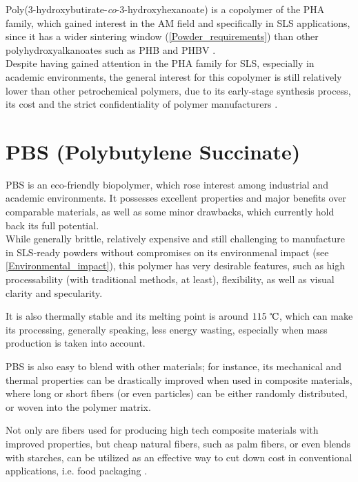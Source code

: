 \documentclass{article}
\begin{document}
    Poly(3-hydroxybutirate-\textit{co}-3-hydroxyhexanoate) is a copolymer of the PHA family, which gained 
    interest in the AM field and specifically in SLS applications, since it has a wider sintering window (\ref{Powder_requirements}) than other polyhydroxyalkanoates
    such as PHB and PHBV \autocites{DechetMaximilianA2020OtDo}{doi:10.1063/1.4918516}. \\ 
    
    Despite having gained attention in the PHA family for SLS, especially in academic environments, the general interest for this copolymer
    is still relatively lower than other 
    petrochemical polymers, due to its early-stage synthesis process, its cost and the strict confidentiality 
    of polymer manufacturers \autocite{Eraslan_PHBH_review}.  \clearpage

    \section{PBS (Polybutylene Succinate) \label{PBS_in_general}}

    PBS is an eco-friendly biopolymer, which rose interest among 
    industrial and academic environments. It possesses excellent properties and major benefits over comparable materials, as well as some minor drawbacks, 
    which currently hold back its full potential. \\ 
    
    While generally brittle, relatively expensive and still challenging to manufacture in SLS-ready powders without compromises on its environmenal 
    impact (see \ref{Environmental_impact}), this polymer has very desirable features, such as high processability 
    (with traditional methods, at least), flexibility, as well as visual clarity and specularity. 

    It is also thermally stable and its melting point is around $115 \ \celsius $, which can make its processing, generally speaking, 
    less energy wasting, especially when mass production is taken into account. 

    PBS is also easy to blend with other materials; for instance, 
    its mechanical and thermal properties can be drastically improved when used in composite materials, where long or short fibers (or 
    even particles) can be either randomly distributed, or woven into the polymer matrix.
    
    Not only are fibers used for producing high tech composite materials with improved properties, but cheap natural fibers, such as 
    palm fibers, or even blends with starches, can be utilized as an effective way to cut down cost in 
    conventional applications, i.e. food packaging \autocite{Rafiqah_Khalina_PBS_review}.
    
\end{document}
